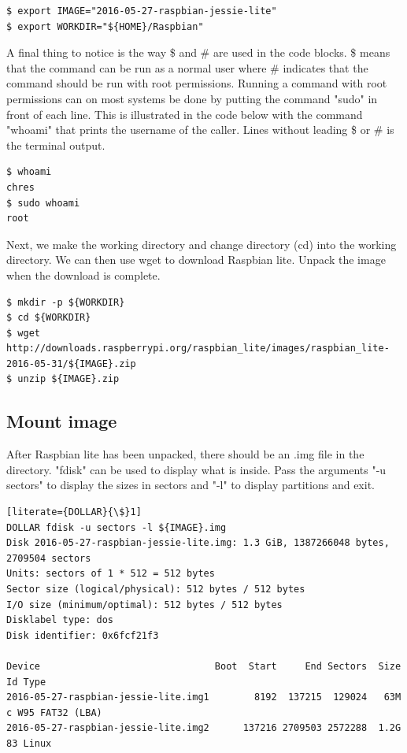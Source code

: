 
\begin{lstlisting}[]
$ export IMAGE="2016-05-27-raspbian-jessie-lite"
$ export WORKDIR="${HOME}/Raspbian"
\end{lstlisting}
\FloatBarrier

A final thing to notice is the way \$ and \# are used in the code blocks. \$
means that the command can be run as a normal user where \# indicates that the
command should be run with root permissions.
Running a command with root permissions can on most systems be done by putting
the command "sudo" in front of each line. This is illustrated in the code below
with the command "whoami" that prints the username of the caller. Lines without
leading \$ or \# is the terminal output.

\begin{lstlisting}[]
$ whoami
chres
$ sudo whoami
root
\end{lstlisting}
\FloatBarrier

Next, we make the working directory and change directory (cd) into the working
directory. We can then use wget to download Raspbian lite. Unpack the image
when the download is complete.

\begin{lstlisting}[]
$ mkdir -p ${WORKDIR}
$ cd ${WORKDIR}
$ wget http://downloads.raspberrypi.org/raspbian_lite/images/raspbian_lite-2016-05-31/${IMAGE}.zip
$ unzip ${IMAGE}.zip
\end{lstlisting}
\FloatBarrier

\subsection{Mount image}

After Raspbian lite has been unpacked, there should be an .img file in the directory.
"fdisk" can be used to display what is inside. Pass the arguments "-u sectors" to
display the sizes in sectors and "-l" to display partitions and exit.

\begin{lstlisting}[literate={DOLLAR}{\$}1]
DOLLAR fdisk -u sectors -l ${IMAGE}.img
Disk 2016-05-27-raspbian-jessie-lite.img: 1.3 GiB, 1387266048 bytes, 2709504 sectors
Units: sectors of 1 * 512 = 512 bytes
Sector size (logical/physical): 512 bytes / 512 bytes
I/O size (minimum/optimal): 512 bytes / 512 bytes
Disklabel type: dos
Disk identifier: 0x6fcf21f3

Device                               Boot  Start     End Sectors  Size Id Type
2016-05-27-raspbian-jessie-lite.img1        8192  137215  129024   63M  c W95 FAT32 (LBA)
2016-05-27-raspbian-jessie-lite.img2      137216 2709503 2572288  1.2G 83 Linux
\end{lstlisting}
\FloatBarrier

